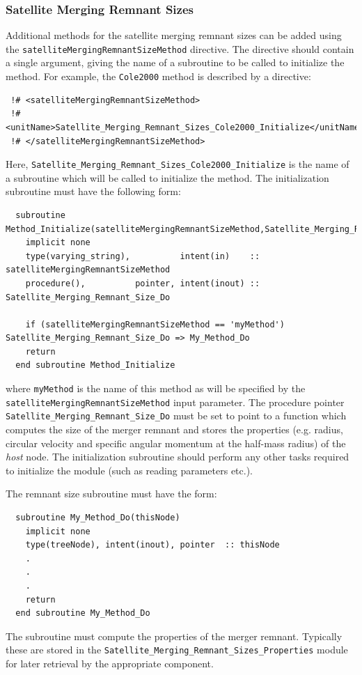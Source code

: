 \subsubsection{Satellite Merging Remnant Sizes}\label{sec:satelliteMergerMassMovementMethod}

Additional methods for the satellite merging remnant sizes can be added using the {\tt satelliteMergingRemnantSizeMethod} directive. The directive should contain a single argument, giving the name of a subroutine to be called to initialize the method. For example, the {\tt Cole2000} method is described by a directive:
\begin{verbatim}
 !# <satelliteMergingRemnantSizeMethod>
 !#  <unitName>Satellite_Merging_Remnant_Sizes_Cole2000_Initialize</unitName>
 !# </satelliteMergingRemnantSizeMethod>
\end{verbatim}
Here, {\tt Satellite\_Merging\_Remnant\_Sizes\_Cole2000\_Initialize} is the name of a subroutine which will be called to initialize the method. The initialization subroutine must have the following form:
\begin{verbatim}
  subroutine Method_Initialize(satelliteMergingRemnantSizeMethod,Satellite_Merging_Remnant_Size_Do)
    implicit none
    type(varying_string),          intent(in)    :: satelliteMergingRemnantSizeMethod
    procedure(),          pointer, intent(inout) :: Satellite_Merging_Remnant_Size_Do
    
    if (satelliteMergingRemnantSizeMethod == 'myMethod') Satellite_Merging_Remnant_Size_Do => My_Method_Do
    return
  end subroutine Method_Initialize
\end{verbatim}
where {\tt myMethod} is the name of this method as will be specified by the {\tt satelliteMergingRemnantSizeMethod} input parameter. The procedure pointer {\tt Satellite\_Merging\_Remnant\_Size\_Do} must be set to point to a function which computes the size of the merger remnant and stores the properties (e.g. radius, circular velocity and specific angular momentum at the half-mass radius) of the \emph{host} node. The initialization subroutine should perform any other tasks required to initialize the module (such as reading parameters etc.).

The remnant size subroutine must have the form:
\begin{verbatim}
  subroutine My_Method_Do(thisNode)
    implicit none
    type(treeNode), intent(inout), pointer  :: thisNode
    .
    .
    .
    return
  end subroutine My_Method_Do
\end{verbatim}
The subroutine must compute the properties of the merger remnant. Typically these are stored in the {\tt Satellite\_Merging\_Remnant\_Sizes\_Properties} module for later retrieval by the appropriate component.

